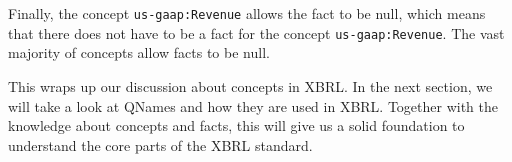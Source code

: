 Finally, the concept \texttt{us-gaap:Revenue} allows the fact to be null, which means that there does not have to be a fact for the concept \texttt{us-gaap:Revenue}.
The vast majority of concepts allow facts to be null.

This wraps up our discussion about concepts in XBRL.
In the next section, we will take a look at QNames and how they are used in XBRL.
Together with the knowledge about concepts and facts, this will give us a solid foundation to understand the core parts of the XBRL standard.